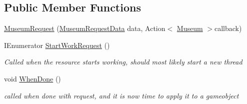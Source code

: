 \subsection*{Public Member Functions}
\begin{DoxyCompactItemize}
\item 
\mbox{\hyperlink{class_museum_request_a5912914896c546559a250b0d6c7fd65b}{Museum\+Request}} (\mbox{\hyperlink{class_museum_request_data}{Museum\+Request\+Data}} data, Action$<$ \mbox{\hyperlink{class_museum}{Museum}} $>$callback)
\item 
I\+Enumerator \mbox{\hyperlink{class_museum_request_a41b1a4699551a86415a877d5380febe1}{Start\+Work\+Request}} ()
\begin{DoxyCompactList}\small\item\em Called when the resource starts working, should most likely start a new thread \end{DoxyCompactList}\item 
void \mbox{\hyperlink{class_museum_request_af34f7bf3bc637d500983a44272577a2e}{When\+Done}} ()
\begin{DoxyCompactList}\small\item\em called when done with request, and it is now time to apply it to a gameobject \end{DoxyCompactList}\end{DoxyCompactItemize}
